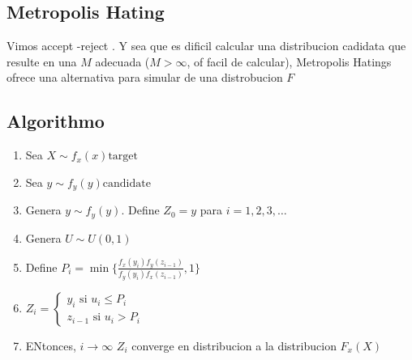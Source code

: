 \documentclass[10pt, oneside]{article}
\begin{document}
\subsection{Metropolis Hating}

Vimos accept -reject . Y sea que es dificil  calcular una distribucion cadidata
que resulte en una $M$ adecuada ($M> \infty$, of facil de calcular), Metropolis Hatings ofrece una alternativa para simular de una distrobucion $F$

\subsection{Algorithmo}

\begin{enumerate}
	\item Sea $X \sim f_x(x) \text{target}$
	\item Sea $y \sim f_y(y) \text{candidate}$
	\item Genera $y \sim f_y(y)$. Define $Z_0 = y$ para $i=1,2,3,\ldots$
	\item Genera $U \sim U(0,1)$
	\item Define $P_i = \min \{ \frac{f_x(y_i)f_y(z_{i-1})}{f_y(y_i)f_x(z_{i-1})}, 1 \}$
	\item $Z_i = \begin{cases} y_i \text{ si } u_i \leq P_i \\
			      z_{i-1} \text{ si } u_i > P_i
		      \end{cases}$
	\item ENtonces, $i \to \infty$ $Z_i$ converge en distribucion a la distribucion $F_x(X)$
\end{enumerate}
\end{document}
